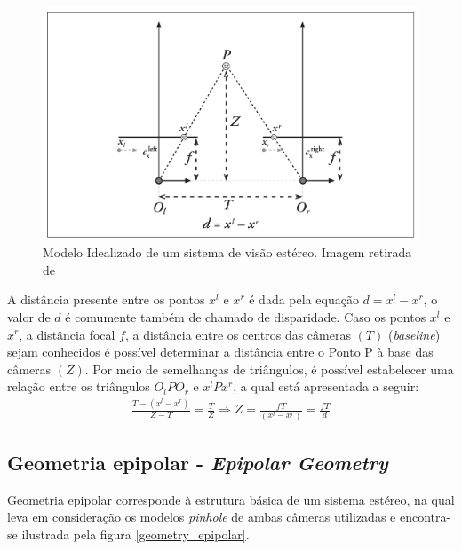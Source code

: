 \begin{figure}[H]
 	\centering
 	\includegraphics[scale=0.35]{./Resources/stereo_image_geometric_model.png}
 	\caption{Modelo Idealizado de um sistema de visão estéreo. Imagem retirada de \cite{Bradski2008}}
 	\label{stereo_image_geometric_model}
\end{figure}

A distância presente entre os pontos $x^l$ e $x^r$ é dada pela equação $d = x^l - x^r$, o valor de $d$ é comumente também de chamado de disparidade. Caso os pontos $x^l$ e $x^r$, a distância focal $f$, a distância entre os centros das câmeras $(T)$ (\textit{baseline}) sejam conhecidos é possível determinar a distância entre o Ponto P à base das câmeras $(Z)$. Por meio de semelhanças de triângulos, é possível estabelecer uma relação entre os triângulos $O_lPO_r$ e $x^lPx^r$, a qual está apresentada a seguir:
\begin{align*}
\frac{T - (x^l-x^r)}{Z-T} = \frac{T}{Z} \Rightarrow Z = \frac{fT}{(x^l-x^r)} = \frac{fT}{d}
\end{align*}


\subsection{Geometria epipolar - \textit{Epipolar Geometry}}

Geometria epipolar corresponde à estrutura básica de um sistema estéreo, na qual leva em consideração os modelos \textit{pinhole} de ambas câmeras utilizadas e encontra-se ilustrada pela figura \ref{geometry_epipolar}. 

